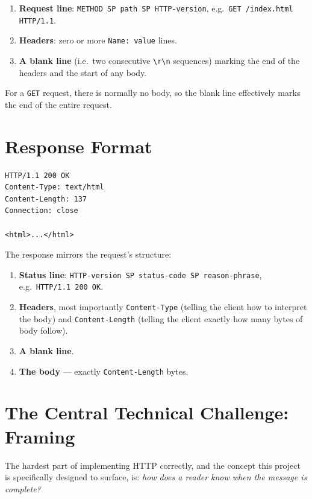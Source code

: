 \begin{enumerate}
    \item \textbf{Request line}: \texttt{METHOD SP path SP HTTP-version}, e.g.\ \texttt{GET /index.html HTTP/1.1}.
    \item \textbf{Headers}: zero or more \texttt{Name: value} lines.
    \item \textbf{A blank line} (i.e.\ two consecutive \texttt{\textbackslash r\textbackslash n} sequences) marking the end of the headers and the start of any body.
\end{enumerate}

For a \texttt{GET} request, there is normally no body, so the blank line effectively marks the end of the entire request.

\section{Response Format}

\begin{lstlisting}[style=bashstyle, numbers=none]
HTTP/1.1 200 OK
Content-Type: text/html
Content-Length: 137
Connection: close

<html>...</html>
\end{lstlisting}

The response mirrors the request's structure:

\begin{enumerate}
    \item \textbf{Status line}: \texttt{HTTP-version SP status-code SP reason-phrase}, e.g.\ \texttt{HTTP/1.1 200 OK}.
    \item \textbf{Headers}, most importantly \texttt{Content-Type} (telling the client how to interpret the body) and \texttt{Content-Length} (telling the client exactly how many bytes of body follow).
    \item \textbf{A blank line}.
    \item \textbf{The body} --- exactly \texttt{Content-Length} bytes.
\end{enumerate}

\section{The Central Technical Challenge: Framing}
\label{sec:http-framing}

The hardest part of implementing HTTP correctly, and the concept this project is specifically designed to surface, is: \emph{how does a reader know when the message is complete?}

